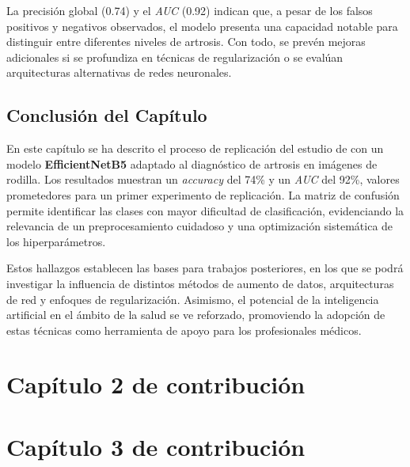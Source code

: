 \documentclass[11pt,spanish,listoffigures,listoftables]{tfgetsinf}
\begin{document}
La precisión global (0.74) y el \textit{AUC} (0.92) indican que, a pesar de los falsos positivos y negativos observados, el modelo presenta una capacidad notable para distinguir entre diferentes niveles de artrosis. Con todo, se prevén mejoras adicionales si se profundiza en técnicas de regularización o se evalúan arquitecturas alternativas de redes neuronales.

\section{Conclusión del Capítulo}
En este capítulo se ha descrito el proceso de replicación del estudio de \cite{10863523} con un modelo \textbf{EfficientNetB5} adaptado al diagnóstico de artrosis en imágenes de rodilla. Los resultados muestran un \textit{accuracy} del 74\% y un \textit{AUC} del 92\%, valores prometedores para un primer experimento de replicación. La matriz de confusión permite identificar las clases con mayor dificultad de clasificación, evidenciando la relevancia de un preprocesamiento cuidadoso y una optimización sistemática de los hiperparámetros.

Estos hallazgos establecen las bases para trabajos posteriores, en los que se podrá investigar la influencia de distintos métodos de aumento de datos, arquitecturas de red y enfoques de regularización. Asimismo, el potencial de la inteligencia artificial en el ámbito de la salud se ve reforzado, promoviendo la adopción de estas técnicas como herramienta de apoyo para los profesionales médicos.
\chapter{Capítulo 2 de contribución}   %


\chapter{Capítulo 3 de contribución}   %

\end{document}
